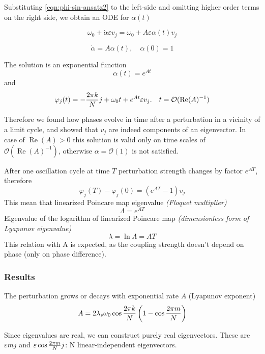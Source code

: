 \documentclass[a4paper,12pt]{article}
\renewcommand*{\Re}{\operatorname{Re}}
\newcommand*{\eps}{\varepsilon}
\newcommand*{\bigO}{\mathcal{O}}
\begin{document}
Substituting \eqref{eqn:phi-sin-ansatz2} to the left-side and omitting higher order terms on the right side, we obtain an ODE for $\alpha(t)$

\begin{equation}
\omega_0 + \dot \alpha \eps v_j  = \omega_0  + A \eps \alpha(t)  v_j 
\end{equation}

\begin{equation}
\dot \alpha  = A \alpha(t), \quad \alpha(0) = 1
\end{equation}

The solution is an exponential function
\begin{equation}
\alpha(t) = e^{A t}
\end{equation}
and 
\begin{equation}
\varphi_j(t)  =  -  \fr{k}{j} + \omega_0 t +  e^{A t}  \eps v_j.
\quad t = \bigO(\Re(A)^{-1})
\end{equation}

Therefore we found how phases evolve in time after a perturbation in a vicinity of a limit cycle, and showed that $v_j$ are indeed components of an eigenvector. 
In case of $\Re(A) > 0$ this solution is valid only on time scales of $\bigO(\Re(A)^{-1})$, otherwise $\alpha = \bigO(1)$ is not satisfied.

After one oscillation cycle at time $T$ perturbation strength changes by factor $e^{AT}$, therefore
\begin{equation}
\varphi_j(T) - \varphi_j(0) = (e^{AT} - 1) v_j
\end{equation}
This mean that linearized Poincare map eigenvalue \textit{(Floquet multiplier)}
$$
\Lambda = e^{A T}
$$
Eigenvalue of the logarithm of linearized Poincare map \textit{(dimensionless form of Lyapunov eigenvalue)}
$$
\lambda = \ln \Lambda = A T
$$
This relation with A is expected, as the coupling strength doesn't depend on phase (only on phase difference).

\subsubsection{Results}

The perturbation grows or decays with exponential rate $A$ (Lyapunov exponent)
$$
A = 2 \lambda_s \omega_0 \cos \frac{2 \pi k} {N}  \left(1 - \cos \frac{2 \pi m} {N}  \right)
$$

Since eigenvalues are real, we can construct purely real eigenvectors. These are $\eps \si{m}{j}$ and  $\eps \co{m}{j}$: N linear-independent eigenvectors.
\end{document}
